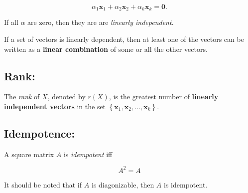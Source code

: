 \documentclass[12pt]{article}
\begin{document}
\begin{equation}
    \alpha_1\mathbf{x}_1  +  \alpha_2\mathbf{x}_2 +  \alpha_k\mathbf{x}_k = \mathbf{0}.
\end{equation}

If all $\alpha$ are zero, then they are are \textit{linearly independent}.

If a set of vectors is linearly dependent, then at least one of the vectors can be written as a \textbf{linear combination} of some or all the other vectors.

\subsection{Rank:}


The \textit{rank} of $X$, denoted by $r(X)$, is the greatest number of \textbf{linearly independent vectors} in the set $\left\{\mathbf{x}_1, \mathbf{x}_2, \dots, \mathbf{x}_k\right\}$.


\subsection{Idempotence:}

A square matrix $A$ is \textit{idempotent} iff

\begin{equation}
    A^2=A
\end{equation}

It should be noted that if $A$ is diagonizable, then $A$ is idempotent.
\end{document}
